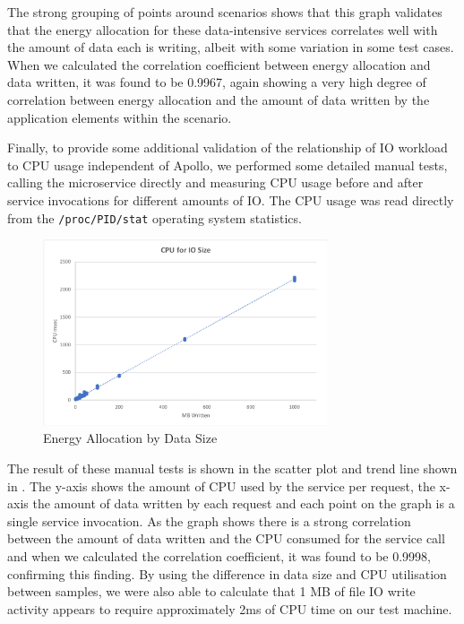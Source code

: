 The strong grouping of points around scenarios shows that this graph validates that the energy allocation for these data-intensive services correlates well with the amount of data each is writing, albeit with some variation in some test cases. When we calculated the correlation coefficient between energy allocation and data written, it was found to be 0.9967, again showing a very high degree of correlation between energy allocation and the amount of data written by the application elements within the scenario.

Finally, to provide some additional validation of the relationship of IO workload to CPU usage independent of Apollo, we performed some detailed manual tests, calling the microservice directly and measuring CPU usage before and after service invocations for different amounts of IO.  The CPU usage was read directly from the \texttt{/proc/PID/stat} operating system statistics.

\begin{figure}
\centering
\includegraphics[width=0.75\textwidth]{Figures/validation-cpubydatasize}
\caption{Energy Allocation by Data Size}
\label{figure:validation-cpubydatasize}
\end{figure}

The result of these manual tests is shown in the scatter plot and trend line shown in .  The y-axis shows the amount of CPU used by the service per request, the x-axis the amount of data written by each request and each point on the graph is a single service invocation.  As the graph shows there is a strong correlation between the amount of data written and the CPU consumed for the service call and when we calculated the correlation coefficient, it was found to be 0.9998, confirming this finding.  By using the difference in data size and CPU utilisation between samples, we were also able to calculate that 1 MB of file IO write activity appears to require approximately 2ms of CPU time on our test machine.


